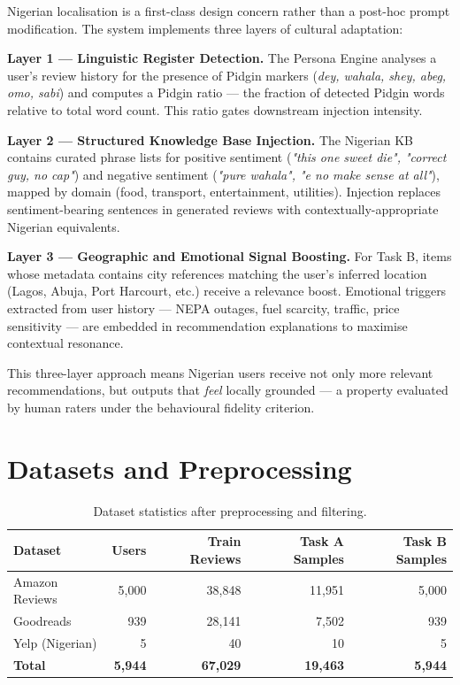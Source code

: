 \documentclass[11pt,a4paper]{article}
\begin{document}
Nigerian localisation is a first-class design concern rather than a post-hoc prompt modification. The system implements three layers of cultural adaptation:

\textbf{Layer 1 — Linguistic Register Detection.} The Persona Engine analyses a user's review history for the presence of Pidgin markers (\textit{dey, wahala, shey, abeg, omo, sabi}) and computes a Pidgin ratio — the fraction of detected Pidgin words relative to total word count. This ratio gates downstream injection intensity.

\textbf{Layer 2 — Structured Knowledge Base Injection.} The Nigerian KB contains curated phrase lists for positive sentiment (\textit{"this one sweet die", "correct guy, no cap"}) and negative sentiment (\textit{"pure wahala", "e no make sense at all"}), mapped by domain (food, transport, entertainment, utilities). Injection replaces sentiment-bearing sentences in generated reviews with contextually-appropriate Nigerian equivalents.

\textbf{Layer 3 — Geographic and Emotional Signal Boosting.} For Task B, items whose metadata contains city references matching the user's inferred location (Lagos, Abuja, Port Harcourt, etc.) receive a relevance boost. Emotional triggers extracted from user history — NEPA outages, fuel scarcity, traffic, price sensitivity — are embedded in recommendation explanations to maximise contextual resonance.

This three-layer approach means Nigerian users receive not only more relevant recommendations, but outputs that \textit{feel} locally grounded — a property evaluated by human raters under the behavioural fidelity criterion.

\section{Datasets and Preprocessing}

\begin{table}[h]
\centering
\caption{Dataset statistics after preprocessing and filtering.}
\begin{tabular}{lrrrr}
\toprule
\textbf{Dataset} & \textbf{Users} & \textbf{Train Reviews} & \textbf{Task A Samples} & \textbf{Task B Samples} \\
\midrule
Amazon Reviews & 5,000 & 38,848 & 11,951 & 5,000 \\
Goodreads & 939 & 28,141 & 7,502 & 939 \\
Yelp (Nigerian) & 5 & 40 & 10 & 5 \\
\midrule
\textbf{Total} & \textbf{5,944} & \textbf{67,029} & \textbf{19,463} & \textbf{5,944} \\
\bottomrule
\end{tabular}
\label{tab:datasets}
\end{table}
\end{document}
